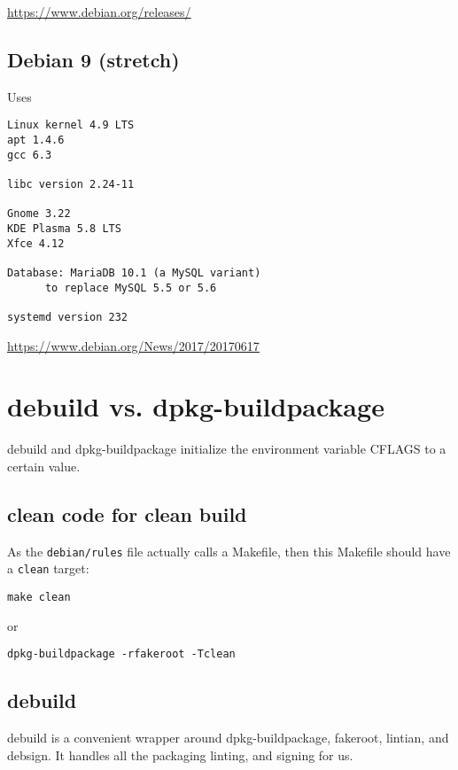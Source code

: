 % 
% 
\url{https://www.debian.org/releases/}

\subsection{Debian 9 (stretch)}
\label{sec:Debian-stretch}

Uses
\begin{verbatim}
Linux kernel 4.9 LTS
apt 1.4.6
gcc 6.3

libc version 2.24-11

Gnome 3.22 
KDE Plasma 5.8 LTS
Xfce 4.12

Database: MariaDB 10.1 (a MySQL variant)
      to replace MySQL 5.5 or 5.6

systemd version 232  
\end{verbatim}

\url{https://www.debian.org/News/2017/20170617}
\section{debuild vs. dpkg-buildpackage}
\label{sec:dkpg-buildpackage}

debuild and dpkg-buildpackage initialize the environment variable  CFLAGS to a
certain value.

\subsection{clean code for clean build}

As the \verb!debian/rules! file actually calls a Makefile, then this Makefile
should have a \verb!clean! target:
\begin{verbatim}
make clean
\end{verbatim}

or
\begin{verbatim}
dpkg-buildpackage -rfakeroot -Tclean
\end{verbatim}

\subsection{debuild}
\label{sec:debuild}

debuild is a convenient wrapper around dpkg-buildpackage, fakeroot, lintian, and
debsign. It handles all the packaging linting, and signing for us.

